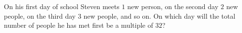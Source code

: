 On his first day of school Steven meets $1$ new person, on the second day $2$ new people, on the third day $3$ new people, and so on. On which day will the total number of people he has met first be a multiple of $32$?
